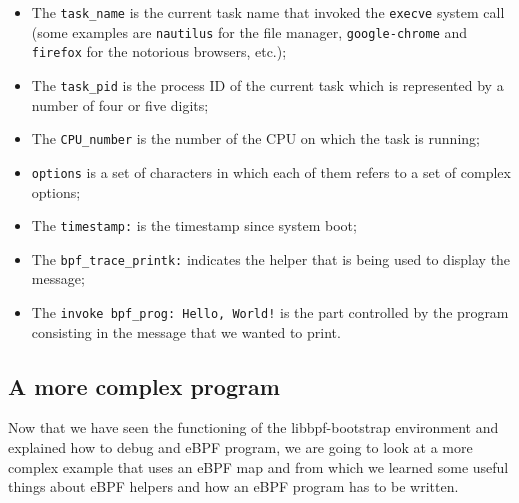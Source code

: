 \begin{itemize}
	\item 
		The \colorbox{backcolour}{\lstinline[style=commandline, language=bash, breaklines=true]|task_name|} is the current task name that invoked the \colorbox{backcolour}{\lstinline[style=commandline, language=bash, breaklines=true]|execve|} system call (some examples are \colorbox{backcolour}{\lstinline[style=commandline, language=bash, breaklines=true]|nautilus|} for the file manager, \colorbox{backcolour}{\lstinline[style=commandline, language=bash, breaklines=true]|google-chrome|} and \colorbox{backcolour}{\lstinline[style=commandline, language=bash, breaklines=true]|firefox|} for the notorious browsers, etc.);
	\item 
		The \colorbox{backcolour}{\lstinline[style=commandline, language=bash, breaklines=true]|task_pid|} is the process ID of the current task which is represented by a number of four or five digits;
	\item 
		The \colorbox{backcolour}{\lstinline[style=commandline, language=bash, breaklines=true]|CPU_number|} is the number of the CPU on which the task is running;
	\item 
		\colorbox{backcolour}{\lstinline[style=commandline, language=bash, breaklines=true]|options|} is a set of characters in which each of them refers to a set of complex options;
	\item 
		The \colorbox{backcolour}{\lstinline[style=commandline, language=bash, breaklines=true]|timestamp:|} is the timestamp since system boot;
	\item 
		The \colorbox{backcolour}{\lstinline[style=commandline, language=bash, breaklines=true]|bpf_trace_printk:|} indicates the helper that is being used to display the message;
	\item 
		The \colorbox{backcolour}{\lstinline[style=commandline, language=bash, breaklines=true]|invoke bpf_prog: Hello, World!|} is the part controlled by the program consisting in the message that we wanted to print.
\end{itemize}

\subsection{A more complex program}

Now that we have seen the functioning of the libbpf-bootstrap environment and explained how to debug and eBPF program, we are going to look at a more complex example that uses an eBPF map and from which we learned some useful things about eBPF helpers and how an eBPF program has to be written.

